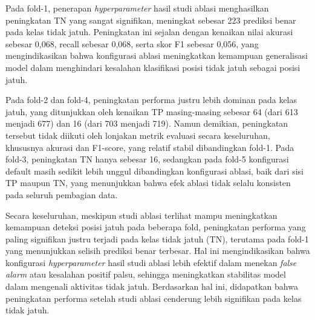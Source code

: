 Pada fold-1, penerapan \textit{hyperparameter} hasil studi ablasi menghasilkan peningkatan TN yang sangat signifikan, meningkat sebesar 223 prediksi benar pada kelas tidak jatuh. Peningkatan ini sejalan dengan kenaikan nilai akurasi sebesar 0,068, recall sebesar 0,068, serta skor F1 sebesar 0,056, yang mengindikasikan bahwa konfigurasi ablasi meningkatkan kemampuan generalisasi model dalam menghindari kesalahan klasifikasi posisi tidak jatuh sebagai posisi jatuh. \par

Pada fold-2 dan fold-4, peningkatan performa justru lebih dominan pada kelas jatuh, yang ditunjukkan oleh kenaikan TP masing-masing sebesar 64 (dari 613 menjadi 677) dan 16 (dari 703 menjadi 719). Namun demikian, peningkatan tersebut tidak diikuti oleh lonjakan metrik evaluasi secara keseluruhan, khususnya akurasi dan F1-score, yang relatif stabil dibandingkan fold-1. Pada fold-3, peningkatan TN hanya sebesar 16, sedangkan pada fold-5 konfigurasi default masih sedikit lebih unggul dibandingkan konfigurasi ablasi, baik dari sisi TP maupun TN, yang menunjukkan bahwa efek ablasi tidak selalu konsisten pada seluruh pembagian data. \par

Secara keseluruhan, meskipun studi ablasi terlihat mampu meningkatkan kemampuan deteksi posisi jatuh pada beberapa fold, peningkatan performa yang paling signifikan justru terjadi pada kelas tidak jatuh (TN), terutama pada fold-1 yang menunjukkan selisih prediksi benar terbesar. Hal ini mengindikasikan bahwa konfigurasi \textit{hyperparameter} hasil studi ablasi lebih efektif dalam menekan \textit{false alarm} atau kesalahan positif palsu, sehingga meningkatkan stabilitas model dalam mengenali aktivitas tidak jatuh. Berdasarkan hal ini, didapatkan bahwa peningkatan performa setelah studi ablasi cenderung lebih signifikan pada kelas tidak jatuh. \par


